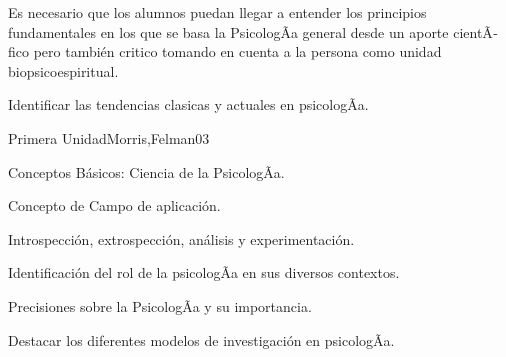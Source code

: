 \begin{syllabus}


\begin{justification}
Es necesario que los alumnos puedan llegar a entender los principios fundamentales en  los que se basa la PsicologÃ­a general desde un aporte cientÃ­fico pero también critico tomando en cuenta a la persona como unidad biopsicoespiritual.
\end{justification}

\begin{goals}
\item Identificar las tendencias clasicas y actuales en psicologÃ­a.
\end{goals}

\begin{outcomes}
\end{outcomes}

\begin{unit}{Primera Unidad}{Morris,Felman}{0}{3}
\begin{topics}
	\item Conceptos Básicos: Ciencia de la PsicologÃ­a.
	\item Concepto de Campo de aplicación.
	\item Introspección, extrospección, análisis y experimentación.
\end{topics}
\begin{unitgoals}
	\item Identificación del rol de la psicologÃ­a en sus diversos contextos.
	\item Precisiones sobre la PsicologÃ­a y su importancia.
	\item Destacar los diferentes modelos de investigación en psicologÃ­a.
\end{unitgoals}
\end{unit}


\end{syllabus}
